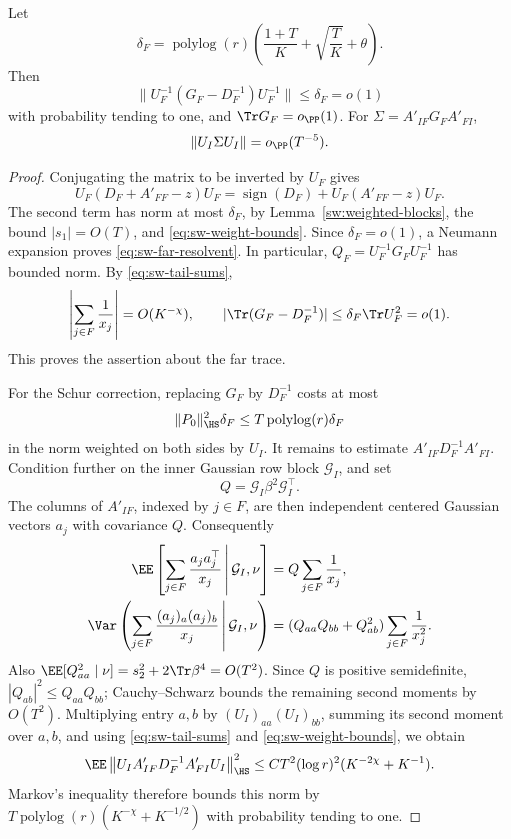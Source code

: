 \begin{lemma}\label{sw:schur}
Let
\[
 \delta_F=\operatorname{polylog}(r)
       \left(\frac{1+T}{K}+\sqrt{\frac TK}+\theta\right).
\]
Then
\begin{equation}\label{eq:sw-far-resolvent}
 \|U_F^{-1}(G_F-D_F^{-1})U_F^{-1}\|\le\delta_F=o(1)
\end{equation}
with probability tending to one, and \(\Tr G_F=o_{\PP}(1)\).
For \(\Sigma=A'_{IF}G_FA'_{FI}\),
\begin{equation}\label{eq:sw-schur-small}
 \|U_I\Sigma U_I\|=o_{\PP}(T^{-5}).
\end{equation}
\end{lemma}

\begin{proof}
Conjugating the matrix to be inverted by \(U_F\) gives
\[
 U_F(D_F+A'_{FF}-z)U_F
 =\operatorname{sign}(D_F)+U_F(A'_{FF}-z)U_F.
\]
The second term has norm at most \(\delta_F\), by
Lemma~\ref{sw:weighted-blocks}, the bound \(|s_1|=O(T)\), and
\eqref{eq:sw-weight-bounds}. Since \(\delta_F=o(1)\), a Neumann expansion
proves \eqref{eq:sw-far-resolvent}. In particular,
\(Q_F=U_F^{-1}G_FU_F^{-1}\) has bounded norm.
By \eqref{eq:sw-tail-sums},
\[
 \left|\sum_{j\in F}\frac1{x_j}\right|=O(K^{-\chi}),
 \qquad
 |\Tr(G_F-D_F^{-1})|
 \le\delta_F\Tr U_F^2=o(1).
\]
This proves the assertion about the far trace.

For the Schur correction, replacing \(G_F\) by \(D_F^{-1}\) costs at most
\begin{equation}\label{eq:sw-schur-replacement}
 \|P_0\|_{\HS}^2\delta_F
 \le T\operatorname{polylog}(r)\delta_F
\end{equation}
in the norm weighted on both sides by \(U_I\).
It remains to estimate
\(A'_{IF}D_F^{-1}A'_{FI}\).
Condition further on the inner Gaussian row block \(\mathcal G_I\), and set
\[
 Q=\mathcal G_I\beta^2\mathcal G_I^\top.
\]
The columns of \(A'_{IF}\), indexed by \(j\in F\), are then independent
centered Gaussian vectors \(a_j\) with covariance \(Q\).
Consequently
\begin{align*}
 \EE\left[\sum_{j\in F}\frac{a_ja_j^\top}{x_j}
       \,\middle|\,\mathcal G_I,\nu\right]
 &=Q\sum_{j\in F}\frac1{x_j},\\
 \Var\left(\sum_{j\in F}\frac{(a_j)_a(a_j)_b}{x_j}
       \,\middle|\,\mathcal G_I,\nu\right)
 &=(Q_{aa}Q_{bb}+Q_{ab}^2)
       \sum_{j\in F}\frac1{x_j^2}.
\end{align*}
Also
\(\EE[Q_{aa}^2\mid\nu]
 =s_2^2+2\Tr\beta^4=O(T^2)\).
Since \(Q\) is positive semidefinite,
\(|Q_{ab}|^2\le Q_{aa}Q_{bb}\); Cauchy--Schwarz bounds the remaining
second moments by \(O(T^2)\).
Multiplying entry \(a,b\) by \((U_I)_{aa}(U_I)_{bb}\), summing its second
moment over \(a,b\), and using \eqref{eq:sw-tail-sums} and
\eqref{eq:sw-weight-bounds}, we obtain
\[
 \EE\left\|
 U_IA'_{IF}D_F^{-1}A'_{FI}U_I
 \right\|_{\HS}^2
 \le C T^2(\log r)^2(K^{-2\chi}+K^{-1}).
\]
Markov's inequality therefore bounds this norm by
\(T\operatorname{polylog}(r)(K^{-\chi}+K^{-1/2})\) with probability
tending to one.


\end{proof}

